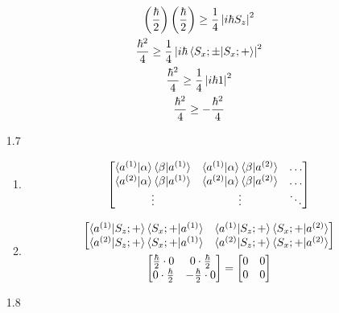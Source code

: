 \documentclass[12pt]{article}
\begin{document}
\begin{enumerate}
\begin{gather*}
            \left(\frac{\hbar}{2}\right)
            \left(\frac{\hbar}{2}\right)
            \geq\frac{1}{4}\left|i\hbar S_z\right|^2\\
            \frac{\hbar^2}{4}\geq\frac{1}{4}\left|i\hbar \braket{S_x ;\pm|S_x ;+}\right|^2\\
            \frac{\hbar^2}{4}\geq\frac{1}{4}\left|i\hbar1\right|^2\\
            \frac{\hbar^2}{4}\geq-\frac{\hbar^2}{4}
        \end{gather*}
        \item[1.7]
        \begin{enumerate}
            \item
            \begin{gather*}
                \begin{bmatrix}
                    \braket{a^{(1)}|\alpha}\braket{\beta|a^{(1)}} & \braket{a^{(1)}|\alpha}\braket{\beta|a^{(2)}} & \ldots\\
                    \braket{a^{(2)}|\alpha}\braket{\beta|a^{(1)}} & \braket{a^{(2)}|\alpha}\braket{\beta|a^{(2)}} & \ldots\\
                    \vdots                                        & \vdots                                        & \ddots
                \end{bmatrix}
            \end{gather*}
            \item
            \begin{gather*}
                \begin{bmatrix}
                    \braket{a^{(1)}|S_z ;+}\braket{S_x ;+|a^{(1)}} & \braket{a^{(1)}|S_z ;+}\braket{S_x ;+|a^{(2)}} \\
                    \braket{a^{(2)}|S_z ;+}\braket{S_x ;+|a^{(1)}} & \braket{a^{(2)}|S_z ;+}\braket{S_x ;+|a^{(2)}}
                \end{bmatrix}\\
                \begin{bmatrix}
                    \frac{\hbar}{2}\cdot0 & 0\cdot\frac{\hbar}{2}  \\
                    0\cdot\frac{\hbar}{2} & -\frac{\hbar}{2}\cdot0
                \end{bmatrix}=
                \begin{bmatrix}
                    0 & 0 \\
                    0 & 0 \\
                \end{bmatrix}
            \end{gather*}
        \end{enumerate}
        \item[1.8]
    \end{enumerate}
\end{document}
